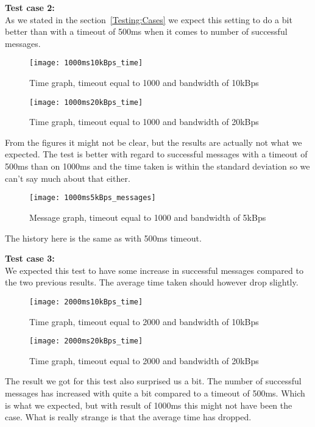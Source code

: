     \textbf{Test case 2:}\\
    As we stated in the section~\ref{Testing:Cases} we expect this setting to do a bit better than with a timeout of 500ms when it comes to number of successful messages.
    \begin{figure}[H]
		\centering
		\texttt{[image: 1000ms10kBps\_time]}
		\caption{Time graph, timeout equal to 1000 and bandwidth of 10kBps} 
		\label{figure:results:1000ms10kBps_time}
	\end{figure}
	
	\begin{figure}[H]
		\centering
		\texttt{[image: 1000ms20kBps\_time]}
		\caption{Time graph, timeout equal to 1000 and bandwidth of 20kBps} 
		\label{figure:results:1000ms20kBps_time}
	\end{figure}
	
	From the figures it might not be clear, but the results are actually not what we expected. The test is better with regard to successful messages with a timeout of 500ms than on 1000ms and the time taken is within the standard deviation so we can't say much about that either.
	
	\begin{figure}[H]
		\centering
		\texttt{[image: 1000ms5kBps\_messages]}
		\caption{Message graph, timeout equal to 1000 and bandwidth of 5kBps} 
		\label{figure:results:1000ms5kBps_messages}
	\end{figure}
	
	The history here is the same as with 500ms timeout.
    
    \textbf{Test case 3:}\\
    We expected this test to have some increase in successful messages compared to the two previous results. The average time taken should however drop slightly.
    \begin{figure}[H]
		\centering
		\texttt{[image: 2000ms10kBps\_time]}
		\caption{Time graph, timeout equal to 2000 and bandwidth of 10kBps} 
		\label{figure:results:2000ms10kBps_time}
	\end{figure}
	
	\begin{figure}[H]
		\centering
		\texttt{[image: 2000ms20kBps\_time]}
		\caption{Time graph, timeout equal to 2000 and bandwidth of 20kBps} 
		\label{figure:results:2000ms20kBps_time}
	\end{figure}
	
	The result we got for this test also surprised us a bit. The number of successful messages has increased with quite a bit compared to a timeout of 500ms. Which is what we expected, but with result of 1000ms this might not have been the case. What is really strange is that the average time has dropped.
	
